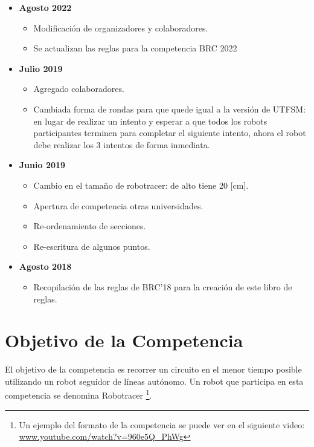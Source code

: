 \begin{itemize}
\item \textbf{Agosto 2022}
  \begin{itemize}
    \item Modificación de organizadores y colaboradores.
    \item Se actualizan las reglas para la competencia BRC 2022
  \end{itemize}
  
  \item \textbf{Julio 2019}
  \begin{itemize}
    \item Agregado colaboradores.
    \item Cambiada forma de rondas para que quede igual a la versión de UTFSM: en lugar de realizar un intento y esperar a que todos los robots participantes terminen para completar el siguiente intento, ahora el robot debe realizar los 3 intentos de forma inmediata.
  \end{itemize}
  \item \textbf{Junio 2019}
  \begin{itemize}
    \item Cambio en el tamaño de robotracer: de alto tiene 20 [cm].
    \item Apertura de competencia otras universidades.
    \item Re-ordenamiento de secciones.
    \item Re-escritura de algunos puntos.
  \end{itemize}
  \item \textbf{Agosto 2018}
  \begin{itemize}
    \item Recopilación de las reglas de BRC'18 para la creación de este libro de reglas.
  \end{itemize}
\end{itemize}

\pagebreak

\section{Objetivo de la Competencia}

El objetivo de la competencia es recorrer un circuito en el menor tiempo posible utilizando un robot seguidor de líneas autónomo. Un robot que participa en esta competencia se denomina Robotracer \footnote{Un ejemplo del formato de la competencia se puede ver en el siguiente video: \href{https://www.youtube.com/watch?v=960e5Q_PhWg}{www.youtube.com/watch?v=960e5Q\_PhWg}}.

